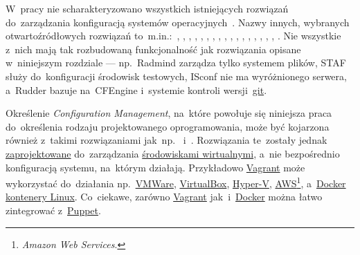 \documentclass[thesis]{subfiles}
\begin{document}
W~pracy nie scharakteryzowano wszystkich istniejących rozwiązań do~zarządzania konfiguracją systemów operacyjnych~\cite{wiki:scm-comparison}. Nazwy innych, wybranych otwartoźródłowych rozwiązań to~m.in.:~, , , , , , , , , , , , , , , , , . Nie wszystkie z~nich mają tak rozbudowaną funkcjonalność jak rozwiązania opisane w~niniejszym rozdziale --- np.~Radmind zarządza tylko systemem plików, STAF służy do~konfiguracji środowisk testowych, ISconf nie ma wyróżnionego serwera, a~Rudder bazuje na~CFEngine i~systemie kontroli wersji~\href{https://en.wikipedia.org/wiki/Git}{git}.

Określenie \emph{Configuration Management}, na~które powołuje się niniejsza praca do~określenia rodzaju projektowanego oprogramowania, może być kojarzona również z~takimi rozwiązaniami jak~np.~ i~. Rozwiązania te~zostały jednak \href{http://stackoverflow.com/questions/16647069/should-i-use-vagrant-or-docker-for-creating-an-isolated-environment}{zaprojektowane} do~zarządzania \href{http://stackoverflow.com/questions/16047306/how-is-docker-different-from-a-normal-virtual-machine}{środowiskami wirtualnymi}, a~nie bezpośrednio konfiguracją systemu, na~którym działają. Przykładowo \href{https://www.vagrantup.com/intro/index.html}{Vagrant} może wykorzystać do~działania np.~\href{https://en.wikipedia.org/wiki/VMware}{VMWare}, \href{https://en.wikipedia.org/wiki/VirtualBox}{VirtualBox}, \href{https://en.wikipedia.org/wiki/Hyper-V}{Hyper-V}, \href{https://en.wikipedia.org/wiki/Amazon_Web_Services}{AWS}\footnote{\emph{Amazon Web Services}.}, a~\href{https://www.docker.com/what-docker}{Docker} \href{https://en.wikipedia.org/wiki/Linux_containers}{kontenery Linux}. Co~ciekawe, zarówno \href{https://www.vagrantup.com/docs/provisioning/puppet_apply.html}{Vagrant} jak~i~\href{https://puppet.com/presentations/using-docker-puppet-james-turnbull-kickstarter}{Docker} można łatwo zintegrować z~\hyperref[sec:puppet]{Puppet}.
\end{document}
